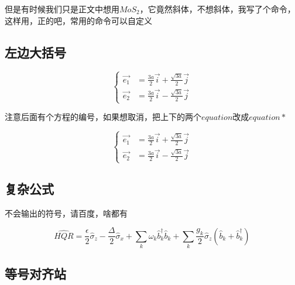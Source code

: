\documentclass[AutoFakeBold]{template/LZUThesis2021_master}
\begin{document}
但是有时候我们只是正文中想用$MoS_2$，它竟然斜体，不想斜体，我写了个命令，这样用，正的吧，常用的命令可以自定义


\subsection{左边大括号} %
\label{sub:左边大括号}

\begin{equation}
    \left\{
    \begin{array}{rcl}
        \vec{e_1} &= \frac{3a}{2} \vec{i} + \frac{\sqrt{3a}}{2} \vec{j} \\
        \vec{e_2} &= \frac{3a}{2} \vec{i} - \frac{\sqrt{3a}}{2} \vec{j}
    \end{array}
    \right.
    \label{e1e2}
\end{equation}

注意后面有个方程的编号，如果想取消，把上下的两个$equation$改成$equation*$

\begin{equation*}
    \left\{
    \begin{array}{rcl}
        \vec{e_1} &= \frac{3a}{2} \vec{i} + \frac{\sqrt{3a}}{2} \vec{j} \\
        \vec{e_2} &= \frac{3a}{2} \vec{i} - \frac{\sqrt{3a}}{2} \vec{j}
    \end{array}
    \right.
    \label{e1e2_2}
\end{equation*}


\subsection{复杂公式} %
\label{sub:复杂公式}
不会输出的符号，请百度，啥都有

\begin{equation}
\hat{HQR}=\frac{\epsilon}{2}\hat{\sigma}_{z}-\frac{\Delta}{2}\hat{\sigma}_{x}+\sum_{k}\omega_{k}\hat{b}_{k}^{\dagger}\hat{b}_{k}+\sum_{k}\frac{g_{k}}{2}\hat{\sigma}_{z}(\hat{b}_{k}+\hat{b}_{k}^{\dagger})\label{eq:sbm}
\end{equation}



\subsection{等号对齐站} %
\label{sub:等号对齐站}
\end{document}
